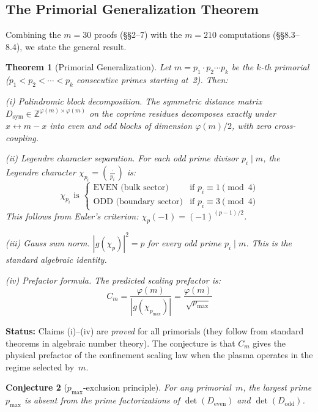 \documentclass[11pt,letterpaper]{article}
\newtheorem{theorem}{Theorem}[section]
\newtheorem{conjecture}[theorem]{Conjecture}
\theoremstyle{definition}
\begin{document}
\subsection{The Primorial Generalization Theorem}

Combining the $m = 30$ proofs (\S\S2--7) with the $m = 210$ computations (\S\S8.3--8.4), we state the general result.

\begin{theorem}[Primorial Generalization]
Let $m = p_1 \cdot p_2 \cdots p_k$ be the $k$-th primorial ($p_1 < p_2 < \cdots < p_k$ consecutive primes starting at~2). Then:

\emph{(i) Palindromic block decomposition.} The symmetric distance matrix $D_{\text{sym}} \in \mathbb{Z}^{\varphi(m) \times \varphi(m)}$ on the coprime residues decomposes exactly under $x \leftrightarrow m - x$ into even and odd blocks of dimension $\varphi(m)/2$, with zero cross-coupling.

\emph{(ii) Legendre character separation.} For each odd prime divisor $p_i \mid m$, the Legendre character $\chi_{p_i} = \left(\frac{\cdot}{p_i}\right)$ is:
\[
\chi_{p_i} \text{ is }
\begin{cases}
\text{EVEN (bulk sector)}      & \text{if } p_i \equiv 1 \pmod{4} \\
\text{ODD (boundary sector)}   & \text{if } p_i \equiv 3 \pmod{4}
\end{cases}
\]
This follows from Euler's criterion: $\chi_p(-1) = (-1)^{(p-1)/2}$.

\emph{(iii) Gauss sum norm.} $|g(\chi_p)|^2 = p$ for every odd prime $p_i \mid m$. This is the standard algebraic identity.

\emph{(iv) Prefactor formula.} The predicted scaling prefactor is:
\[
C_m = \frac{\varphi(m)}{|g(\chi_{p_{\text{max}}})|} = \frac{\varphi(m)}{\sqrt{p_{\text{max}}}}
\]
\end{theorem}

\textbf{Status:} Claims (i)--(iv) are \emph{proved} for all primorials (they follow from standard theorems in algebraic number theory). The conjecture is that $C_m$ gives the physical prefactor of the confinement scaling law when the plasma operates in the regime selected by~$m$.

\begin{conjecture}[$p_{\text{max}}$-exclusion principle]
For any primorial~$m$, the largest prime $p_{\text{max}}$ is absent from the prime factorizations of $\det(D_{\text{even}})$ and $\det(D_{\text{odd}})$.
\end{conjecture}
\end{document}
